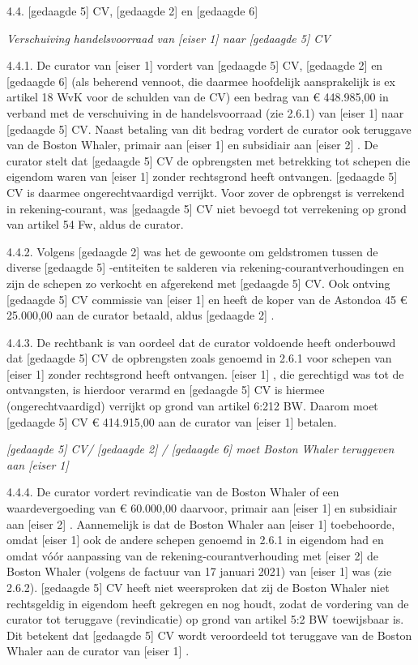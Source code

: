 \documentclass[
  dutch,
  a4paper,
]{article}
\begin{document}
4.4. {[}gedaagde 5{]} CV, {[}gedaagde 2{]} en {[}gedaagde 6{]}

\emph{Verschuiving handelsvoorraad van {[}eiser 1{]} naar {[}gedaagde 5{]} CV}

4.4.1. De curator van {[}eiser 1{]} vordert van {[}gedaagde 5{]} CV, {[}gedaagde 2{]} en {[}gedaagde 6{]} (als beherend vennoot, die daarmee hoofdelijk aansprakelijk is ex artikel 18 WvK voor de schulden van de CV) een bedrag van € 448.985,00 in verband met de verschuiving in de handelsvoorraad (zie 2.6.1) van {[}eiser 1{]} naar {[}gedaagde 5{]} CV. Naast betaling van dit bedrag vordert de curator ook teruggave van de Boston Whaler, primair aan {[}eiser 1{]} en subsidiair aan {[}eiser 2{]} . De curator stelt dat {[}gedaagde 5{]} CV de opbrengsten met betrekking tot schepen die eigendom waren van {[}eiser 1{]} zonder rechtsgrond heeft ontvangen. {[}gedaagde 5{]} CV is daarmee ongerechtvaardigd verrijkt. Voor zover de opbrengst is verrekend in rekening-courant, was {[}gedaagde 5{]} CV niet bevoegd tot verrekening op grond van artikel 54 Fw, aldus de curator.

4.4.2. Volgens {[}gedaagde 2{]} was het de gewoonte om geldstromen tussen de diverse {[}gedaagde 5{]} -entiteiten te salderen via rekening-courantverhoudingen en zijn de schepen zo verkocht en afgerekend met {[}gedaagde 5{]} CV. Ook ontving {[}gedaagde 5{]} CV commissie van {[}eiser 1{]} en heeft de koper van de Astondoa 45 € 25.000,00 aan de curator betaald, aldus {[}gedaagde 2{]} .

4.4.3. De rechtbank is van oordeel dat de curator voldoende heeft onderbouwd dat {[}gedaagde 5{]} CV de opbrengsten zoals genoemd in 2.6.1 voor schepen van {[}eiser 1{]} zonder rechtsgrond heeft ontvangen. {[}eiser 1{]} , die gerechtigd was tot de ontvangsten, is hierdoor verarmd en {[}gedaagde 5{]} CV is hiermee (ongerechtvaardigd) verrijkt op grond van artikel 6:212 BW. Daarom moet {[}gedaagde 5{]} CV € 414.915,00 aan de curator van {[}eiser 1{]} betalen.

\emph{{[}gedaagde 5{]} CV/ {[}gedaagde 2{]} / {[}gedaagde 6{]} moet Boston Whaler teruggeven aan {[}eiser 1{]}}

4.4.4. De curator vordert revindicatie van de Boston Whaler of een waardevergoeding van € 60.000,00 daarvoor, primair aan {[}eiser 1{]} en subsidiair aan {[}eiser 2{]} . Aannemelijk is dat de Boston Whaler aan {[}eiser 1{]} toebehoorde, omdat {[}eiser 1{]} ook de andere schepen genoemd in 2.6.1 in eigendom had en omdat vóór aanpassing van de rekening-courantverhouding met {[}eiser 2{]} de Boston Whaler (volgens de factuur van 17 januari 2021) van {[}eiser 1{]} was (zie 2.6.2). {[}gedaagde 5{]} CV heeft niet weersproken dat zij de Boston Whaler niet rechtsgeldig in eigendom heeft gekregen en nog houdt, zodat de vordering van de curator tot teruggave (revindicatie) op grond van artikel 5:2 BW toewijsbaar is. Dit betekent dat {[}gedaagde 5{]} CV wordt veroordeeld tot teruggave van de Boston Whaler aan de curator van {[}eiser 1{]} .
\end{document}
